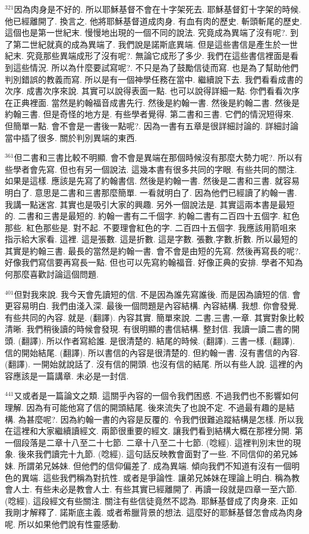 \documentclass{book}
\begin{document}
$^{321}$因為肉身是不好的.
所以耶穌基督不會在十字架死去.
耶穌基督釘十字架的時候.
他已經離開了.
換言之.
他將耶穌基督道成肉身.
有血有肉的歷史.
斬頭斬尾的歷史.
這個也是第一世紀末.
慢慢地出現的一個不同的說法.
究竟成為異端了沒有呢?.
到了第二世紀就真的成為異端了.
我們說是諾斯底異端.
但是這些書信是產生於一世紀末.
究竟那些異端成形了沒有呢?.
無論它成形了多少.
我們在這些書信裡面是看到這些情況.
所以為什麼要試寫呢?.
不只是為了鼓勵信徒而寫.
也是為了幫助他們判別錯誤的教義而寫.
所以是有一個神學任務在當中.
繼續說下去.
我們看看成書的次序.
成書次序來說.
其實可以說得表面一點.
也可以說得詳細一點.
你們看看次序在正典裡面.
當然是約翰福音成書先行.
然後是約翰一書.
然後是約翰二書.
然後是約翰三書.
但是奇怪的地方是.
有些學者覺得.
第二書和三書.
它們的情況短得來.
但簡單一點.
會不會是一書後一點呢?.
因為一書有五章是很詳細討論的.
詳細討論當中插了很多.
關於判別異端的東西.

$^{361}$但二書和三書比較不明顯.
會不會是異端在那個時候沒有那麼大勢力呢?.
所以有些學者會先寫.
但也有另一個說法.
這幾本書有很多共同的字眼.
有些共同的關注.
如果是這樣.
應該是先寫了約翰書信.
然後是約翰一書.
然後是二書和三書.
就容易明白了.
意思是二書和三書那麼簡單.
一看就明白了.
因為他們已經讀了約翰一書.
我講一點迷宮.
其實也是吸引大家的興趣.
另外一個說法是.
其實這兩本書是最短的.
二書和三書是最短的.
約翰一書有二千個字.
約翰二書有二百四十五個字.
紅色那些.
紅色那些是.
對不起.
不要理會紅色的字.
二百四十五個字.
我應該用箭咀來指示給大家看.
這裡.
這是張數.
這是折數.
這是字數.
張數,字數,折數.
所以最短的其實是約翰三書.
最長的當然是約翰一書.
會不會是由短的先寫.
然後再寫長的呢?.
好像我們寫信要再寫長一點.
但也可以先寫約翰福音.
好像正典的安排.
學者不知為何那麼喜歡討論這個問題.

$^{401}$但對我來說.
我今天會先讀短的信.
不是因為誰先寫誰後.
而是因為讀短的信.
會更容易明白.
我們由淺入深.
最後一個問題是內容結構.
內容結構.
我想.
你會發覺.
有些共同的內容.
就是.
(翻譯).
內容其實.
簡單來說.
二書,三書,一章.
其實對象比較清晰.
我們稍後讀的時候會發現.
有很明顯的書信結構.
整封信.
我讀一讀二書的開頭.
(翻譯).
所以作者寫給誰.
是很清楚的.
結尾的時候.
(翻譯).
三書一樣.
(翻譯).
信的開始結尾.
(翻譯).
所以書信的內容是很清楚的.
但約翰一書.
沒有書信的內容.
(翻譯).
一開始就說話了.
沒有信的開頭.
也沒有信的結尾.
所以有些人說.
這裡的內容應該是一篇講章.
未必是一封信.

$^{441}$又或者是一篇論文之類.
這關乎內容的一個令我們困惑.
不過我們也不影響如何理解.
因為有可能他寫了信的開頭結尾.
後來流失了也說不定.
不過最有趣的是結構.
為甚麼呢?.
因為約翰一書的內容是反覆的.
令我們很難追蹤結構是怎樣.
所以我在這裡和大家繼續讀經文.
兩節很重要的經文.
讓我們看到結構大概在那裡分開.
第一個段落是二章十八至二十七節.
二章十八至二十七節.
(唸經).
這裡判別末世的現象.
後來我們讀完十九節.
(唸經).
這句話反映教會面對了一些.
不同信仰的弟兄姊妹.
所謂弟兄姊妹.
但他們的信仰偏差了.
成為異端.
傾向我們不知道有沒有一個明色的異端.
這些我們稱為對抗性.
或者是爭論性.
讓弟兄姊妹在理論上明白.
稱為教會人士.
有些未必是教會人士.
有些其實已經離開了.
再讀一段就是四章一至六節.
(唸經).
這段經文有些關注.
關注有些信徒竟然不認為.
耶穌基督成了肉身來.
正如我剛才解釋了.
諾斯底主義.
或者希臘背景的想法.
這麼好的耶穌基督怎會成為肉身呢.
所以如果他們說有性靈感動.
\end{document}
